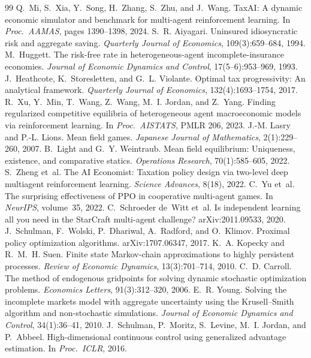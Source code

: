 \documentclass{article}
\begin{document}
\FloatBarrier %
{\small
\begin{thebibliography}{99}\setlength{\itemsep}{0pt}
 Q.~Mi, S.~Xia, Y.~Song, H.~Zhang, S.~Zhu, and J.~Wang. {TaxAI}: A dynamic economic simulator and benchmark for multi-agent reinforcement learning. In \emph{Proc.\ AAMAS}, pages 1390--1398, 2024.
 S.~R. Aiyagari. Uninsured idiosyncratic risk and aggregate saving. \emph{Quarterly Journal of Economics}, 109(3):659--684, 1994.
 M.~Huggett. The risk-free rate in heterogeneous-agent incomplete-insurance economies. \emph{Journal of Economic Dynamics and Control}, 17(5--6):953--969, 1993.
 J.~Heathcote, K.~Storesletten, and G.~L. Violante. Optimal tax progressivity: An analytical framework. \emph{Quarterly Journal of Economics}, 132(4):1693--1754, 2017.
 R.~Xu, Y.~Min, T.~Wang, Z.~Wang, M.~I. Jordan, and Z.~Yang. Finding regularized competitive equilibria of heterogeneous agent macroeconomic models via reinforcement learning. In \emph{Proc.\ AISTATS}, PMLR 206, 2023.
 J.-M. Lasry and P.-L. Lions. Mean field games. \emph{Japanese Journal of Mathematics}, 2(1):229--260, 2007.
 B.~Light and G.~Y. Weintraub. Mean field equilibrium: Uniqueness, existence, and comparative statics. \emph{Operations Research}, 70(1):585--605, 2022.
 S.~Zheng et~al. The {AI} {E}conomist: Taxation policy design via two-level deep multiagent reinforcement learning. \emph{Science Advances}, 8(18), 2022.
 C.~Yu et~al. The surprising effectiveness of {PPO} in cooperative multi-agent games. In \emph{NeurIPS}, volume~35, 2022.
 C.~Schroeder de~Witt et~al. Is independent learning all you need in the {StarCraft} multi-agent challenge? arXiv:2011.09533, 2020.
 J.~Schulman, F.~Wolski, P.~Dhariwal, A.~Radford, and O.~Klimov. Proximal policy optimization algorithms. arXiv:1707.06347, 2017.
 K.~A. Kopecky and R.~M.~H. Suen. Finite state {M}arkov-chain approximations to highly persistent processes. \emph{Review of Economic Dynamics}, 13(3):701--714, 2010.
 C.~D. Carroll. The method of endogenous gridpoints for solving dynamic stochastic optimization problems. \emph{Economics Letters}, 91(3):312--320, 2006.
 E.~R. Young. Solving the incomplete markets model with aggregate uncertainty using the {K}rusell--{S}mith algorithm and non-stochastic simulations. \emph{Journal of Economic Dynamics and Control}, 34(1):36--41, 2010.
 J.~Schulman, P.~Moritz, S.~Levine, M.~I. Jordan, and P.~Abbeel. High-dimensional continuous control using generalized advantage estimation. In \emph{Proc.\ ICLR}, 2016.
\end{thebibliography}
}
\end{document}
